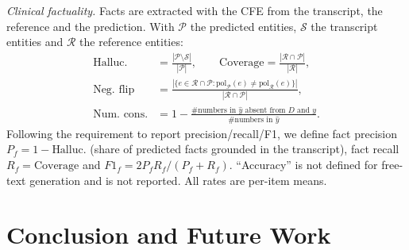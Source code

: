 \documentclass[conference]{IEEEtran}
\begin{document}
\emph{Clinical factuality.} Facts are extracted with the CFE from the transcript, the reference and the
prediction. With $\mathcal{P}$ the predicted entities, $\mathcal{S}$ the transcript entities and
$\mathcal{R}$ the reference entities:
\begin{align}
\text{Halluc.} &= \frac{|\mathcal{P}\setminus\mathcal{S}|}{|\mathcal{P}|},\qquad
\text{Coverage} = \frac{|\mathcal{R}\cap\mathcal{P}|}{|\mathcal{R}|},\\
\text{Neg.\ flip} &= \frac{|\{e\in\mathcal{R}\cap\mathcal{P}: \text{pol}_{\mathcal{P}}(e)\neq\text{pol}_{\mathcal{R}}(e)\}|}{|\mathcal{R}\cap\mathcal{P}|},\\
\text{Num.\ cons.} &= 1-\frac{\#\text{numbers in }\hat{y}\text{ absent from }D\text{ and }y}{\#\text{numbers in }\hat{y}}.
\end{align}
Following the requirement to report precision/recall/F1, we define fact precision
$P_f = 1-\text{Halluc.}$ (share of predicted facts grounded in the transcript), fact recall $R_f=\text{Coverage}$
and $F1_f = 2P_fR_f/(P_f+R_f)$. ``Accuracy'' is not defined for free-text generation and is not reported. All
rates are per-item means.



\section{Conclusion and Future Work}\label{sec:conc}

\end{document}
